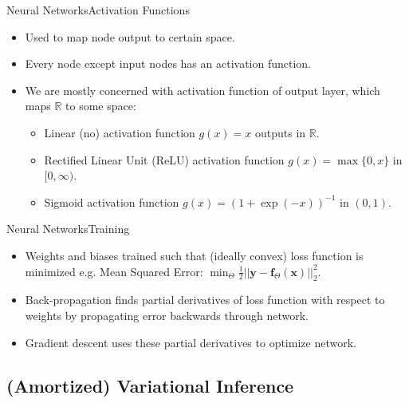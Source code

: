 \documentclass{beamer}
\newcommand{\R}{\mathbb{R}}
\begin{document}
\begin{frame}{Neural Networks}{Activation Functions}
\begin{itemize}
\item Used to map node output to certain space.
\item Every node except input nodes has an activation function.
\item We are mostly concerned with activation function of output layer, which maps $\R$ to some space:
\begin{itemize}
\item Linear (no) activation function $g(x)=x$ outputs in $\R$.
\item Rectified Linear Unit (ReLU) activation function $g(x)=\max\{0,x\}$ in $[0,\infty)$.
\item Sigmoid activation function $g(x)=(1+\exp(-x))^{-1}$ in $(0,1)$.
\end{itemize}
\end{itemize}
\end{frame}
\begin{frame}{Neural Networks}{Training}
\begin{itemize}
\item Weights and biases trained such that (ideally convex) loss function is minimized e.g. Mean Squared Error: $\min_\Theta \frac{1}{2}||\bm{y}-\bm{f}_\Theta(\bm{x})||^2_2$.
\item Back-propagation finds partial derivatives of loss function with respect to weights by propagating error backwards through network.
\item Gradient descent uses these partial derivatives to optimize network.
\end{itemize}
\end{frame}
\subsection{(Amortized) Variational Inference}
\end{document}
